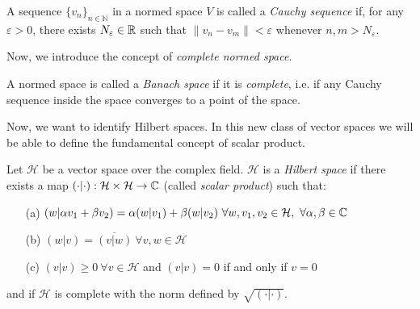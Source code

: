 \begin{definition} A sequence $\{v_n\}_{n\in\mathbb{N}}$ in a normed space $V$ is called a \textit{Cauchy sequence} if, for any $\varepsilon>0$, there exists $N_\varepsilon\in{\mathbb R}$ such that $\|v_n-v_m\|<\varepsilon$ whenever $n,m>N_\varepsilon$.
\end{definition}

Now, we introduce the concept of \textit{complete normed space}. 

\begin{definition}
 A normed space is called a \textit{Banach space} if it is
 \textit{complete}, i.e. if any Cauchy sequence inside the space converges to a point of the
 space.
\end{definition}

 Now, we want to identify Hilbert spaces. In this new class of vector spaces we will be able to define the fundamental concept of scalar product.  
 \begin{definition}
 	Let $\mathcal{H}$ be a vector space over the complex field. $\mathcal{H}$ is a \textit{Hilbert space} if there exists a map $(\cdot|\cdot):\mathcal{H}\times \mathcal{H}\to {\mathbb C}$ (called \textit{scalar product}) such that:
 	\begin{itemize}
 		\item[(a)] $(w|\alpha v_1+ \beta v_2)=\alpha(w|v_1)+\beta(w|v_2)\ \forall w,v_1,v_2 \in \mathcal{H},\ \forall \alpha,\beta\in\mC$
 		\item[(b)] $(w|v)=\overline{(v|w)}\ \forall v,w\in \mathcal{H}$
 		\item[(c)] $(v|v)\ge0\ \forall v\in \mathcal{H}$ and $(v|v)=0$ if and only if $v=0$
 	\end{itemize}
 	and if $\mathcal{H}$ is complete with the norm defined by $\sqrt{(\cdot|\cdot)}$.
 \end{definition}
 
